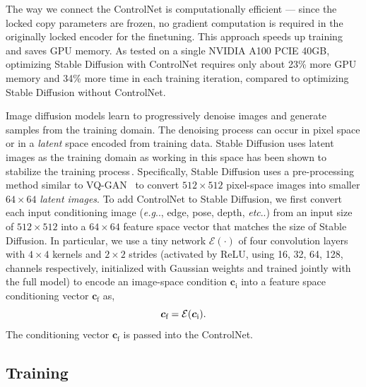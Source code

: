 \documentclass[10pt,twocolumn,letterpaper]{article}
\makeatletter
\DeclareRobustCommand\onedot{\futurelet\@let@token\@onedot}
\def\@onedot{\ifx\@let@token.\else.\null\fi\xspace}
\def\eg{\emph{e.g}\onedot}
\def\etc{\emph{etc}\onedot}
\makeatother
\begin{document}
	The way we connect the ControlNet is computationally efficient ---
	since the locked copy parameters are frozen, no gradient computation
	is required in the originally locked encoder for the finetuning.  This
	approach speeds up training and saves GPU memory. As tested on a
	single NVIDIA A100 PCIE 40GB, optimizing Stable Diffusion with
	ControlNet requires only about 23\% more GPU memory and 34\% more time
	in each training iteration, compared to optimizing Stable Diffusion
	without ControlNet.
	
	Image diffusion models learn to progressively denoise images and
	generate samples from the training domain.  The denoising process can
	occur in pixel space or in a {\em latent} space encoded from training
	data. Stable Diffusion uses latent images as the training domain as
	working in this space has been shown to stabilize the
	training process\,\cite{rombach2021highresolution}.
	Specifically, Stable Diffusion uses a pre-processing method similar to
	VQ-GAN~\cite{esser2021taming} to convert $512\times 512$ pixel-space images into
	smaller $64\times 64$ {\em latent images}.
	To add ControlNet to Stable Diffusion, 
	we first convert each input conditioning image (\eg, edge, pose, depth, \etc) from an input size of $512\times 512$ into a
	$64\times 64$ feature space vector that matches the size of Stable Diffusion.  
	In particular, we use a tiny network
	$\mathcal{E}(\cdot)$ of four convolution layers with $4\times 4$
	kernels and $2 \times 2$ strides (activated by ReLU, using 16, 32, 64,
	128, channels respectively, initialized with Gaussian weights and
	trained jointly with the full model) to encode an image-space
	condition $\bm{c}_\text{i}$ into a feature space conditioning vector
	$\bm{c}_\text{f}$ as,
	\vspace{-3pt}\begin{equation}\vspace{-3pt}
		\bm{c}_\text{f}=\mathcal{E}(\bm{c}_\text{i}).
	\end{equation}
	The conditioning vector $\bm{c}_\text{f}$ is passed into the ControlNet.
	
	\subsection{Training}
	\label{sec:train}
	
\end{document}
